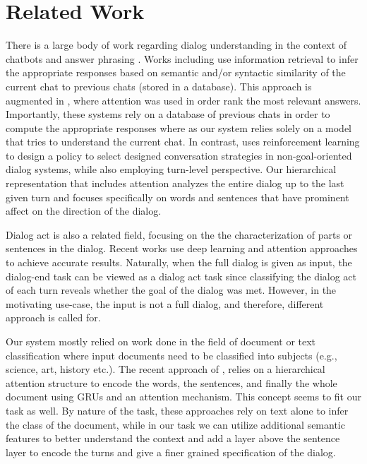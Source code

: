 \section{Related Work}\label{sec:related}
There is a large body of work regarding dialog 
understanding in the context of chatbots and answer phrasing 
\cite{Jia09,ShawarA03,ShawarA08,BanchsK14,iris,noGoal,QiuLWGCZCHC17,YuXBR16,yu2016chatbot}. 
Works including \cite{iris,noGoal} use information 
retrieval to infer the appropriate responses based on 
semantic and/or syntactic similarity of the 
current chat to previous chats (stored in a database).  
This approach is augmented in \cite{QiuLWGCZCHC17}, 
where attention \cite{BahdanauCB14} was used in order 
rank the most relevant answers. 
Importantly, these systems rely on a database of previous 
chats in order to compute the appropriate responses where as 
our system relies solely on a model that tries to understand 
the current chat. 
In contrast, \cite{YuXBR16} uses reinforcement learning 
to design a policy to select designed
conversation strategies in non-goal-oriented dialog
systems, while also employing turn-level perspective. 
Our hierarchical representation 
that includes attention analyzes the entire dialog up to the last 
given turn and focuses specifically on words and sentences that 
have prominent affect on the direction of the dialog.

Dialog act \cite{DBLP:conf/icassp/JiB05,DBLP:conf/coling/WermterL96,AngLS05,SurendranL06,li2016multi,ortega2017neural} 
is also a related field, focusing on the 
the characterization of parts or sentences in the dialog. Recent works \cite{li2016multi,ortega2017neural} use 
deep learning and attention approaches to achieve accurate results. 
Naturally, when the full dialog is given as input, the dialog-end task 
can be viewed as a dialog act task since classifying the dialog act 
of each turn reveals whether the goal of the dialog was met. 
However, in the motivating use-case, the input is not a full dialog, and 
therefore, different approach is called for. 

Our system mostly relied on work 
done in the field of document or text classification \cite{attention,ZhangZL15,Lai,elhadad2017novel,van2017effective} 
where input documents need to be classified into subjects 
(e.g., science, art, history etc.). 
The recent approach of \cite{attention}, 
relies on a hierarchical attention structure to 
encode the words, the sentences, and finally the whole document 
using GRUs and an attention mechanism. 
This concept seems to fit our task as well. 
By nature of the task, these approaches rely on text alone to infer the class 
of the document, while in our task we can utilize additional semantic features to better 
understand the context and add a layer above the sentence layer 
to encode the turns and give a finer grained specification of the dialog. 
